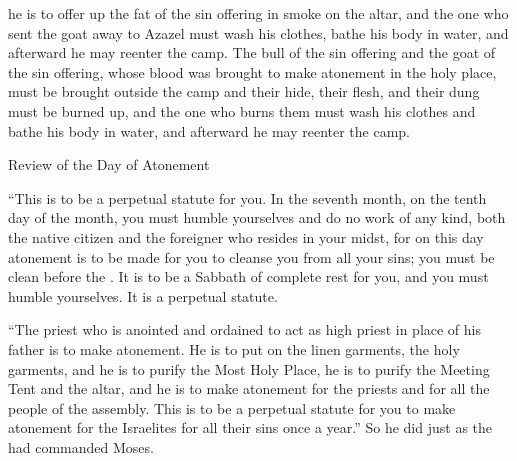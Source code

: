 {he is to offer up the fat
of the sin offering
in smoke
on the altar,
and the one who sent
the goat
away to Azazel
must wash
his clothes,
bathe
his body
in water,
and afterward
he may reenter
the camp.
The
bull
of the sin offering
and the
goat
of the sin offering,
whose
blood
was brought
to make atonement
in the holy
place, must be brought
outside
the camp
and their hide,
their flesh,
and their dung
must be burned up,
and the one who burns
them must wash
his clothes
and bathe
his body
in water,
and afterward
he may reenter
the camp.
\par }{\SH Review of the Day of Atonement
\par }{\PP {}“This is to be
a perpetual
statute
for you. In the seventh
month,
on the tenth
day of the month,
you must humble
yourselves
and do no
work
of any
kind, both the native citizen
and the foreigner
who resides
in your midst,
for
on this
day
atonement
is to be made for you to cleanse
you from all
your sins;
you must be clean
before
the {}.
It is to be a Sabbath
of complete rest
for you, and you must humble
yourselves.
It is a perpetual
statute.
\par }{\PP {}“The priest
who
is anointed
and ordained
to act as high priest in place
of his father
is to make atonement.
He is to put on
the linen
garments,
the
holy
garments,
and he is
to purify
the
Most Holy
Place,
he is to purify the
Meeting
Tent
and the
altar,
and he is to make atonement
for the priests
and for all
the people
of the assembly.
This
is to be a perpetual
statute
for you to make atonement
for the Israelites
for all
their sins
once
a year.”
So he did
just
as the
{}
had commanded
Moses.

}
